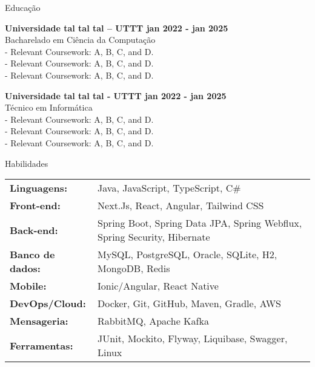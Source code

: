 \documentclass{resume} %
\begin{document}

\begin{rSection}{Educação}

{\bf Universidade tal tal tal – UTTT \hfill {jan 2022 - jan 2025}}\\
{Bacharelado em Ciência da Computação}\\
- Relevant Coursework: A, B, C, and D.\\
- Relevant Coursework: A, B, C, and D.\\
- Relevant Coursework: A, B, C, and D.\\

\vspace{1.25em}

{\bf Universidade tal tal tal - UTTT \hfill {jan 2022 - jan 2025}}\\
{Técnico em Informática}\\
- Relevant Coursework: A, B, C, and D.\\
- Relevant Coursework: A, B, C, and D.\\
- Relevant Coursework: A, B, C, and D.\\

\end{rSection}


\begin{rSection}{Habilidades}

\begin{tabular}{ @{} >{\bfseries}l @{\hspace{6ex}} l }
Linguagens: &  Java, JavaScript, TypeScript, C\#\\
Front-end: & Next.Js, React, Angular, Tailwind CSS\\
Back-end: & Spring Boot, Spring Data JPA, Spring Webflux, Spring Security, Hibernate\\
Banco de dados: & MySQL, PostgreSQL, Oracle, SQLite, H2, MongoDB, Redis\\
Mobile: & Ionic/Angular, React Native\\
DevOps/Cloud: & Docker, Git, GitHub, Maven, Gradle, AWS\\
Mensageria: & RabbitMQ, Apache Kafka\\
Ferramentas: & JUnit, Mockito, Flyway, Liquibase, Swagger, Linux\\
\end{tabular}\\

\end{rSection}
\end{document}
